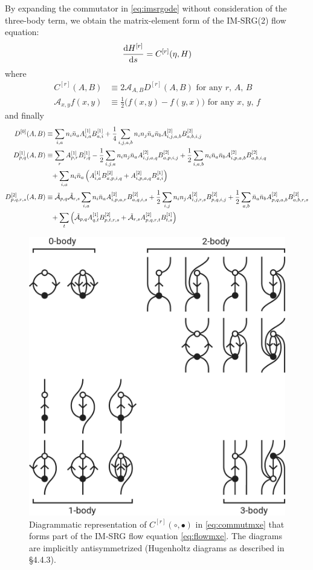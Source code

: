 By expanding the commutator in \eqref{eq:imsrgode} without consideration of the three-body term, we obtain the matrix-element form of the IM-SRG(2) flow equation:
\begin{align}
    \frac{\operatorname{d\!} H^{[r]}}{\operatorname{d\!} s} = C^{[r]}(\eta, H) \label{eq:flowmxe}
\end{align}
where
\begin{align}
  C^{[r]}(A, B) &\equiv 2 \mathcal{A}_{A, B} D^{[r]}(A, B) \text{ for any $r$, $A$, $B$} \label{eq:commutmxe} \\
  \mathcal{A}_{x, y} f(x, y) &\equiv \frac{1}{2} \bigl(f(x, y) - f(y, x)\bigr) \text{ for any $x$, $y$, $f$}
\end{align}
and finally
\begin{align}
  D^{[0]}(A, B)
  &\equiv
    \sum_{i, a} n_i \bar{n}_a A^{[1]}_{i, a} B^{[1]}_{a, i}
    + \frac{1}{4} \sum_{i, j, a, b} n_i n_j \bar{n}_a \bar{n}_b A^{[2]}_{i, j, a, b} B^{[2]}_{a, b, i, j}
    \label{eq:flow0} \\
  D^{[1]}_{p, q}(A, B)
  &\equiv
    \sum_{r} A^{[1]}_{p, r} B^{[1]}_{r, q}
    - \frac{1}{2} \sum_{i, j, a} n_i n_j \bar{n}_a A^{[2]}_{i, j, a, q} B^{[2]}_{a, p, i, j}
    + \frac{1}{2} \sum_{i, a, b} n_i \bar{n}_a \bar{n}_b A^{[2]}_{i, p, a, b} B^{[2]}_{a, b, i, q}
    \notag \\
  &\hphantom{=}
    + \sum_{i, a} n_i \bar{n}_a \left(
    A^{[1]}_{i, a} B^{[2]}_{a, p, i, q}
    + A^{[2]}_{i, p, a, q} B^{[1]}_{a, i}
    \right)
    \label{eq:flow1} \\
  D^{[2]}_{p, q, r, s}(A, B)
  &\equiv
    \tilde{\mathcal{A}}_{p, q} \tilde{\mathcal{A}}_{r, s}
    \sum_{i, a} n_i \bar{n}_a A^{[2]}_{i, p, a, r} B^{[2]}_{a, q, i, s}
    + \frac{1}{2} \sum_{i, j} n_i n_j A^{[2]}_{i, j, r, s} B^{[2]}_{p, q, i, j}
    + \frac{1}{2} \sum_{a, b} \bar{n}_a \bar{n}_b A^{[2]}_{p, q, a, b} B^{[2]}_{a, b, r, s}
    \notag \\
  &\hphantom{=}
    + \sum_{t} \left(
    \tilde{\mathcal{A}}_{p, q} A^{[1]}_{q, t} B^{[2]}_{p, t, r, s}
    + \tilde{\mathcal{A}}_{r, s} A^{[2]}_{p, q, r, t} B^{[1]}_{t, s}
    \right)
    \label{eq:flow2}
\end{align}
\begin{figure}
\includegraphics[width=.48\linewidth]{fig-diagrams-imsrg}
\caption{Diagrammatic representation of $C^{[r]}(\circ, \bullet)$ in \eqref{eq:commutmxe} that forms part of the IM-SRG flow equation \eqref{eq:flowmxe}.  The diagrams are implicitly antisymmetrized (Hugenholtz diagrams \cite{HUGENHOLTZ1957481} as described in \cite{shavitt2009many} \S 4.4.3).}
\label{fig:diagrams-imsrg}
\end{figure}
